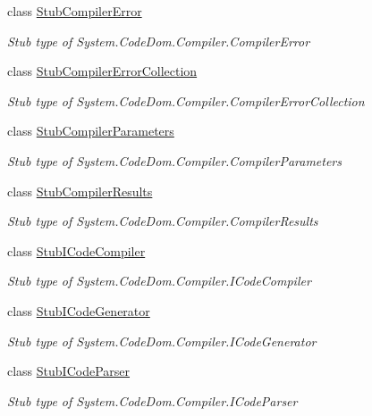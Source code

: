 \begin{DoxyCompactItemize}
class \hyperlink{class_system_1_1_code_dom_1_1_compiler_1_1_fakes_1_1_stub_compiler_error}{Stub\-Compiler\-Error}
\begin{DoxyCompactList}\small\item\em Stub type of System.\-Code\-Dom.\-Compiler.\-Compiler\-Error\end{DoxyCompactList}\item 
class \hyperlink{class_system_1_1_code_dom_1_1_compiler_1_1_fakes_1_1_stub_compiler_error_collection}{Stub\-Compiler\-Error\-Collection}
\begin{DoxyCompactList}\small\item\em Stub type of System.\-Code\-Dom.\-Compiler.\-Compiler\-Error\-Collection\end{DoxyCompactList}\item 
class \hyperlink{class_system_1_1_code_dom_1_1_compiler_1_1_fakes_1_1_stub_compiler_parameters}{Stub\-Compiler\-Parameters}
\begin{DoxyCompactList}\small\item\em Stub type of System.\-Code\-Dom.\-Compiler.\-Compiler\-Parameters\end{DoxyCompactList}\item 
class \hyperlink{class_system_1_1_code_dom_1_1_compiler_1_1_fakes_1_1_stub_compiler_results}{Stub\-Compiler\-Results}
\begin{DoxyCompactList}\small\item\em Stub type of System.\-Code\-Dom.\-Compiler.\-Compiler\-Results\end{DoxyCompactList}\item 
class \hyperlink{class_system_1_1_code_dom_1_1_compiler_1_1_fakes_1_1_stub_i_code_compiler}{Stub\-I\-Code\-Compiler}
\begin{DoxyCompactList}\small\item\em Stub type of System.\-Code\-Dom.\-Compiler.\-I\-Code\-Compiler\end{DoxyCompactList}\item 
class \hyperlink{class_system_1_1_code_dom_1_1_compiler_1_1_fakes_1_1_stub_i_code_generator}{Stub\-I\-Code\-Generator}
\begin{DoxyCompactList}\small\item\em Stub type of System.\-Code\-Dom.\-Compiler.\-I\-Code\-Generator\end{DoxyCompactList}\item 
class \hyperlink{class_system_1_1_code_dom_1_1_compiler_1_1_fakes_1_1_stub_i_code_parser}{Stub\-I\-Code\-Parser}
\begin{DoxyCompactList}\small\item\em Stub type of System.\-Code\-Dom.\-Compiler.\-I\-Code\-Parser\end{DoxyCompactList}\item 

\end{DoxyCompactItemize}
